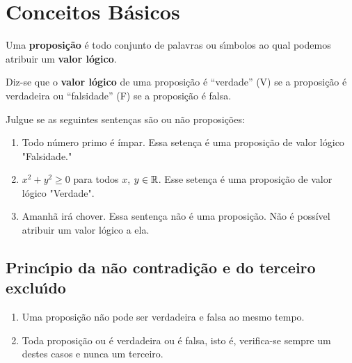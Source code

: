 \chapter{Conceitos B\'asicos} %
\label{cha:conceitos_basicos}

\begin{definicao}
	Uma \textbf{proposi\c{c}\~ao} \'e todo conjunto de palavras ou s{\'\i}mbolos ao qual podemos atribuir um \textbf{valor l\'ogico}.
\end{definicao}

\begin{definicao}
	Diz-se que o \textbf{valor l\'ogico} de uma proposi\c{c}\~ao \'e ``verdade'' (V) se a proposi\c{c}\~ao \'e verdadeira ou ``falsidade'' (F) se a proposi\c{c}\~ao \'e falsa.
\end{definicao}

\begin{exemplos}
	Julgue se as seguintes sentenças são ou não proposições:
	\begin{enumerate}[label={\arabic*})]
		\item Todo número primo é ímpar.
		Essa setença é uma proposição de valor lógico "Falsidade."
		\item $x^2 + y^2 \ge 0$ para todos $x$, $y \in \mathbb{R}$.
		Esse setença é uma proposição de valor lógico "Verdade".
		\item Amanhã irá chover.
		Essa sentença não é uma proposição. Não é possível atribuir um valor lógico a ela.
	\end{enumerate}

\end{exemplos}

\section{Princ{\'\i}pio da n\~ao contradi\c{c}\~ao e do terceiro exclu{\'\i}do} %
\label{sec:principio_da_nao_contradicao_e_do_3}
\begin{enumerate}[label={\roman*})]
	\item Uma proposi\c{c}\~ao n\~ao pode ser verdadeira e falsa ao mesmo tempo.
	\item Toda proposi\c{c}\~ao ou \'e verdadeira ou \'e falsa, isto \'e, verifica-se sempre um destes casos e nunca um terceiro.
\end{enumerate}

